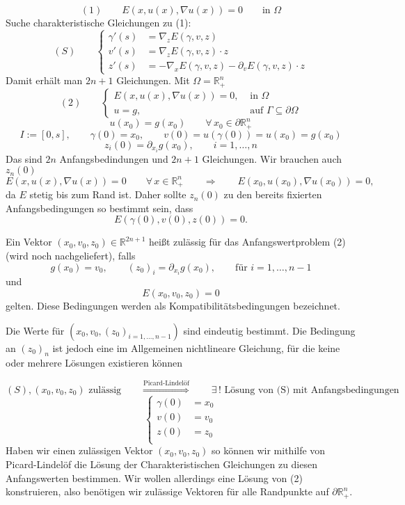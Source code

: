 
\[
	(1) \qquad E(x,u(x), \nabla u(x)) = 0 \qquad \text{in }\Omega
\]
Suche charakteristische Gleichungen zu (1):
\[
	(S) \qquad \begin{cases}
		\gamma'(s) &=  \nabla_z E(\gamma,v,z) \\
		v'(s) &=  \nabla_z E(\gamma,v,z) \cdot z \\
		z'(s) &= -  \nabla_x E(\gamma,v,z) - \partial_v E(\gamma,v,z) \cdot z
	\end{cases}
\]
Damit erhält man $2n+1$ Gleichungen. Mit $\Omega = \mathbb{R}^n_+$
\[
(2) \qquad 	\begin{cases}
		E(x,u(x), \nabla u(x)) = 0, &\text{ in }\Omega\\
		u=g, &\text{ auf } \Gamma \subseteq \partial \Omega
	\end{cases}
\]
\[
	u(x_0) = g(x_0) \qquad \forall\, x_0 \in  \partial \mathbb{R}^n_+
\]
\[
	I:= [0,s], \qquad \gamma(0) = x_0, \qquad v(0) = u(\gamma(0)) = u(x_0) = g(x_0)
\]
\[
	z_i(0) = \partial_{x_i} g(x_0), \qquad i=1,\dots,n
\]
Das sind $2n$ Anfangsbedindungen und $2n+1$ Gleichungen. Wir brauchen auch $z_n(0)$
\[
	E(x,u(x), \nabla u(x)) = 0 \qquad \forall\, x \in \mathbb{R}^n_+ \qquad \Rightarrow \qquad E(x_0,u(x_0), \nabla u(x_0)) = 0,
\]
da $E$ stetig bis zum Rand ist. Daher sollte $z_n(0)$ zu den bereits fixierten Anfangsbedingungen so bestimmt sein, dass
\[
	E(\gamma(0),v(0),z(0))=0.
\]

\begin{definition*}
	Ein Vektor $(x_0,v_0,z_0) \in \mathbb{R}^{2n+1}$ heißt zulässig für das Anfangswertproblem (2) (wird noch nachgeliefert), falls \[
		g(x_0)=v_0, \qquad (z_0)_i = \partial_{x_i}g(x_0), \qquad \text{für }i=1,\dots,n-1
	\]
	und
	\[
		E(x_0,v_0,z_0) = 0
	\]
	gelten. Diese Bedingungen werden als Kompatibilitätsbedingungen bezeichnet.
\end{definition*}

\begin{bemerkung}
	Die Werte für $(x_0,v_0,(z_0)_{i=1,\dots,n-1})$ sind eindeutig bestimmt. Die Bedingung an $(z_0)_n$ ist jedoch eine im Allgemeinen nichtlineare Gleichung, für die
	keine oder mehrere Lösungen existieren können
\end{bemerkung}
\[
	(S), (x_0,v_0,z_0) \text{ zulässig} \qquad \stackrel{\text{Picard-Lindelöf}}{\Rightarrow } \qquad \exists\,! \text{ Lösung von (S) mit Anfangsbedingungen }\]
	\[
		\begin{cases}
				\gamma(0)&= x_0\\
				v(0)&=v_0 \\
				z(0)&=z_0 \\
		\end{cases}
	\]
Haben wir einen zulässigen Vektor $(x_0,v_0,z_0)$ so können wir mithilfe von Picard-Lindelöf die Lösung der Charakteristischen Gleichungen zu diesen Anfangswerten bestimmen. Wir wollen allerdings eine Lösung von (2) konstruieren, also benötigen wir zulässige Vektoren für alle Randpunkte auf $\partial \mathbb{R}^n_+$.

